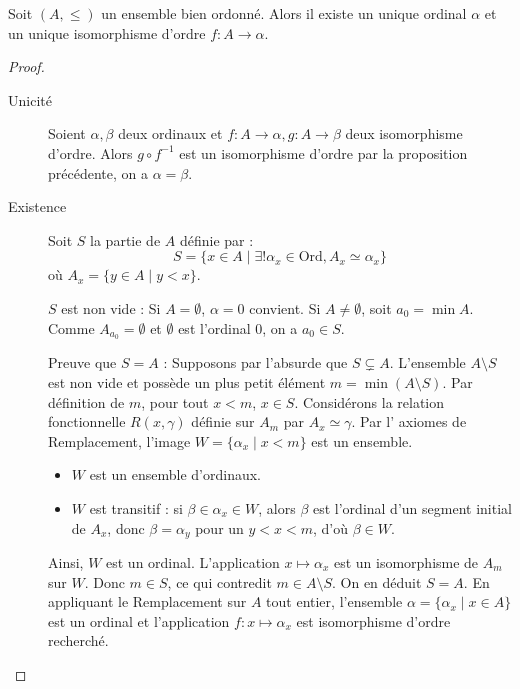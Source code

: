 \begin{theoreme}\label{ens : ordinal : isomorphisme_entre_bo_et_ordinal}
Soit $(A, \leq)$ un ensemble bien ordonné. Alors il existe un unique ordinal 
$\alpha$ et un unique isomorphisme d'ordre $f : A \to \alpha$.
\end{theoreme}
\begin{proof}
    \begin{description}

         \item[Unicité]
Soient $\alpha,\beta$ deux ordinaux et $f : A\to \alpha, g : A\to \beta$ deux isomorphisme d'ordre. Alors $g\circ f^{-1}$ est un isomorphisme d'ordre par la proposition précédente, on a $\alpha = \beta$.

    
    
        \item[Existence]
Soit $S$ la partie de $A$ définie par :
\[ S = \{ x \in A \mid \exists! \alpha_x \in \text{Ord}, A_x \simeq \alpha_x \} \]
où $A_x = \{ y \in A \mid y < x \}$.

$S$ est non vide : Si $A = \emptyset$, $\alpha = 0$ convient. Si $A \neq \emptyset$, soit $a_0 = \min A$. Comme $A_{a_0} = \emptyset$ et $\emptyset$ est l'ordinal $0$, on a $a_0 \in S$.

Preuve que $S = A$ : Supposons par l'absurde que $S \subsetneq A$. L'ensemble $A \setminus S$ est non vide et possède un plus petit élément $m = \min(A \setminus S)$. Par définition de $m$, pour tout $x < m$, $x \in S$.
Considérons la relation fonctionnelle $R(x, \gamma)$ définie sur $A_m$ par $A_x \simeq \gamma$. Par l' axiomes de Remplacement, l'image $W = \{ \alpha_x \mid x < m \}$ est un ensemble.
\begin{itemize}
    \item $W$ est un ensemble d'ordinaux.
    \item $W$ est transitif : si $\beta \in \alpha_x \in W$, alors $\beta$ est l'ordinal d'un segment initial de $A_x$, donc $\beta = \alpha_y$ pour un $y < x < m$, d'où $\beta \in W$.
\end{itemize}
Ainsi, $W$ est un ordinal. L'application $x \mapsto \alpha_x$ est un isomorphisme de $A_m$ sur $W$. Donc $m \in S$, ce qui contredit $m \in A \setminus S$. On en déduit $S = A$.
En appliquant le Remplacement sur $A$ tout entier, l'ensemble $\alpha = \{ \alpha_x \mid x \in A \}$ est un ordinal et l'application $f : x \mapsto \alpha_x$ est isomorphisme d'ordre recherché.

        
       
    \end{description}
\end{proof}

